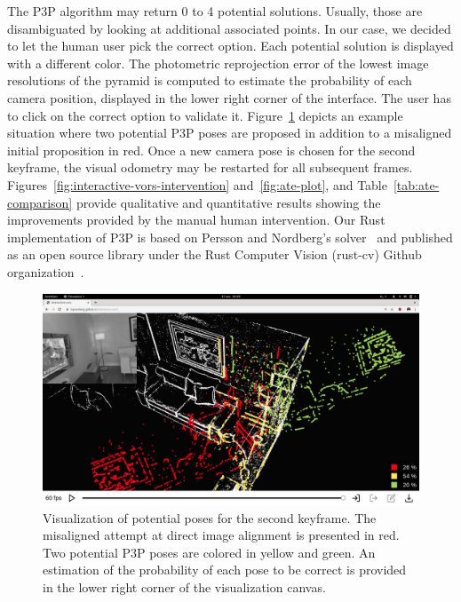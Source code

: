 The P3P algorithm may return 0 to 4 potential solutions.
Usually, those are disambiguated by looking at additional associated points.
In our case, we decided to let the human user pick the correct option.
Each potential solution is displayed with a different color.
The photometric reprojection error of the lowest image resolutions of the pyramid
is computed to estimate the probability of each camera position,
displayed in the lower right corner of the interface.
The user has to click on the correct option to validate it.
Figure~\ref{fig:p3p-two-poses} depicts an example situation where two potential
P3P poses are proposed in addition to a misaligned initial proposition in red.
Once a new camera pose is chosen for the second keyframe,
the visual odometry may be restarted for all subsequent frames.
Figures~\ref{fig:interactive-vors-intervention} and~\ref{fig:ate-plot},
and Table~\ref{tab:ate-comparison} provide qualitative and quantitative results
showing the improvements provided by the manual human intervention.
Our Rust implementation of P3P is based on Persson and Nordberg's solver~\cite{persson2018lambda}
and published as an open source library under the Rust Computer Vision (rust-cv)
Github organization~\cite{rust-p3p}.

\begin{figure}[t]
	\centering
	\includegraphics[width=\linewidth]{assets/img/p3p-two.png}
	\caption{Visualization of potential poses for the second keyframe.
	The misaligned attempt at direct image alignment is presented in red.
	Two potential P3P poses are colored in yellow and green.
	An estimation of the probability of each pose to be correct is
	provided in the lower right corner of the visualization canvas.}%
	\label{fig:p3p-two-poses}
\end{figure}

